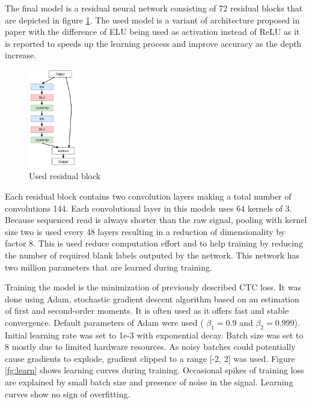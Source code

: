 \documentclass[times, utf8, diplomski, numeric, english]{fer}
\begin{document}
The final model is a residual neural network consisting of 72 residual blocks that are depicted in figure \ref{fg:model_block}. The used model is a variant of architecture proposed in paper \cite{identitet} with the difference of ELU being used as activation instead of ReLU as it is reported\cite{resnet-elu} to speeds up the learning process and improve accuracy as the depth increase.
\begin{figure}[!ht]
	\begin{center}
		\includegraphics[width=0.2\textwidth]{./imgs/model.png}
		\caption{Used residual block}
		\label{fg:model_block}
	\end{center}
\end{figure} 

Each residual block contains two convolution layers making a total number of convolutions 144. Each convolutional layer in this models uses 64 kernels of 3. Because sequenced read is always shorter than the raw signal, pooling with kernel size two is used every 48 layers resulting in a reduction of dimensionality by factor 8. This is used reduce computation effort and to help training by reducing the number of required blank labels outputed by the network. This network has two million parameters that are learned during training. 

Training the model is the minimization of previously described CTC loss. It was done using Adam\cite{adam}, stochastic gradient descent algorithm based on an estimation of first and second-order moments.
It is often used as it offers fast and stable convergence. Default parameters of Adam were used (
$\beta_1=0.9$ and $\beta_2=0.999$). Initial learning rate was set to 1e-3 with exponential decay. Batch size was set to 8 mostly due to limited hardware resources. As noisy batches could potentially cause gradients to explode, gradient clipped to a range [-2, 2] was used.
Figure \ref{fg:learn} shows learning curves during training. Occasional spikes of training loss are explained by small batch size and presence of noise in the signal. Learning curves show no sign of overfitting.
\end{document}
